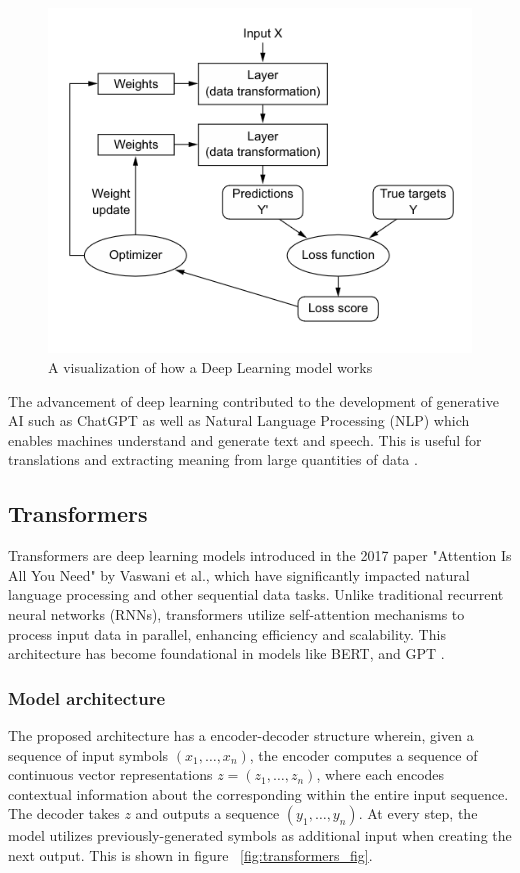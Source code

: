 \documentclass[licencjacka,en]{pracamgr}
\begin{document}
\begin{figure}
    \centering
    \includegraphics[width=0.5\linewidth]{bachelor_images/nn_function.png}
    \caption{A visualization of how a Deep Learning model works \cite{francuz_9}}
    \label{fig:nn_function}
\end{figure}

The advancement of deep learning contributed to the development of generative AI such as ChatGPT as well as Natural Language Processing (NLP) which enables machines understand and generate text and speech. This is useful for translations and extracting meaning from large quantities of data \cite{ibm_dl}.

\subsection{Transformers}
Transformers are deep learning models introduced in the 2017 paper "Attention Is All You Need" \cite{attention} by Vaswani et al., which have significantly impacted natural language processing and other sequential data tasks. Unlike traditional recurrent neural networks (RNNs), transformers utilize self-attention mechanisms to process input data in parallel, enhancing efficiency and scalability. This architecture has become foundational in models like BERT, and GPT \cite{medium_t}.

\subsubsection{Model architecture}
The proposed architecture has a encoder-decoder structure wherein, given a sequence of input symbols $ (x_1, … , x_n) $, the encoder computes a sequence of continuous vector representations $ z = (z_1, … , z_n) $, where each encodes contextual information about the corresponding within the entire input sequence. The decoder takes $ z $ and outputs a sequence $ (y_1, … , y_n) $. At every step, the model utilizes previously-generated symbols as additional input when creating the next output. This is shown in figure ~\ref{fig:transformers_fig}. 
\end{document}
